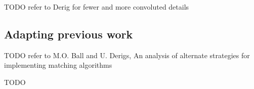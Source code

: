 TODO refer to Derig for fewer and more convoluted details

\subsection{Adapting previous work}
TODO refer to M.O. Ball and U. Derigs, An analysis of alternate strategies for implementing matching algorithms



TODO